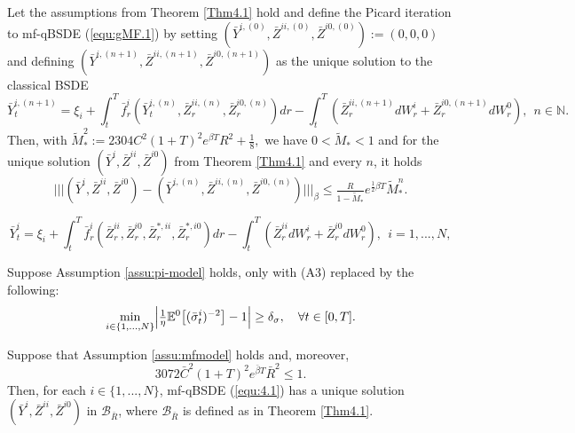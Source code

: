\documentclass[10pt,a4paper]{amsart}
\newcommand{\bC}{\bar{C}}
\newcommand{\bR}{\bar{R}}
\newcommand{\be}{\begin{equation}}
\newcommand{\ee}{\end{equation}}
\newcommand{\trinm}[1]{\vert\!\vert\!\vert #1 \vert\!\vert\!\vert}
\begin{document}
\begin{Corollary}
\label{Cor4.2}
Let the assumptions from Theorem \ref{Thm4.1} hold and define the Picard iteration to mf-qBSDE \textnormal{(\ref{equ:gMF.1})} by setting $(\bar{Y}^{i,(0)},\bar{Z}^{ii,(0)},\bar{Z}^{i0,(0)}):= (0,0,0)$ and defining $(\bar{Y}^{i,(n+1)},\bar{Z}^{ii,(n+1)},\bar{Z}^{i0,(n+1)})$ as the unique solution to the classical BSDE
\[
\bar{Y}_{t}^{i,(n+1)} = \xi_{i} + \int_{t}^{T}\bar{f}_{r}^{i}(\bar{Y}_{t}^{i,(n)},\bar{Z}_{r}^{ii,(n)},\bar{Z}_{r}^{i0,(n)})dr - \int_{t}^{T}(\bar{Z}_{r}^{ii,(n+1)}dW_{r}^{i}+\bar{Z}_{r}^{i0,(n+1)}dW_{r}^{0}), \ \ n \in \mathbb{N}.
\]
Then, with
$
\tilde{M}_{*}^{2} := 2304C^{2}(1+T)^{2}e^{\beta T}R^{2} + \tfrac{1}{8},
$
we have $0<\tilde{M}_{*}<1$ and for the unique solution $(\bar{Y}^{i},\bar{Z}^{ii},\bar{Z}^{i0})$ from Theorem \ref{Thm4.1} and every $n$, it holds
\begin{equation}
\label{NdimPicard2}
\trinm{(\bar{Y}^{i},\bar{Z}^{ii},\bar{Z}^{i0})-(\bar{Y}^{i,(n)},\bar{Z}^{ii,(n)},\bar{Z}^{i0,(n)})}_\beta \leq \tfrac{R}{1-\tilde{M}_{*}}e^{\tfrac{1}{2}\beta T}\tilde{M}_{*}^{n}.
\end{equation}
\end{Corollary}

\begin{equation}
\label{equ:4.1}
\bar{Y}_{t}^{i} = \xi_{i} + \int_{t}^{T}\bar{f}_{r}^{i}(\bar{Z}_{r}^{ii},\bar{Z}_{r}^{i0},\bar{Z}_{r}^{*,ii},\bar{Z}_{r}^{*,i0})dr - \int_{t}^{T}(\bar{Z}_{r}^{ii}dW_{r}^{i}+\bar{Z}_{r}^{i0}dW_{r}^{0}), \ \ i=1,...,N,
\end{equation}

\begin{Assumption}\label{assu:mfmodel}
    Suppose Assumption \ref{assu:pi-model} holds, only with \textnormal{(A3)} replaced by the following: 
$$
\min_{i\in \{1,...,N\} } \Bigl|\tfrac{1}{\eta}\mathbb{E}^{0}\bigl[(\bar{\sigma}_{t}^{i})^{-2}\bigr]-1\Bigr| \geq \delta_{\sigma}, \ \ \ \forall t \in [0,T].
$$
\end{Assumption}

\begin{Corollary}
\label{Cor4.5}
Suppose that Assumption \ref{assu:mfmodel} holds and, moreover,
\be\label{assu:modelbd1}
3072 \bC^{2}(1+T)^{2}e^{\bar{\beta} T} \bR^{2} \leq 1.
\ee
Then, for each $i \in \{1,...,N\}$, mf-qBSDE \textnormal{(\ref{equ:4.1})} has a unique solution $(\bar{Y}^{i},\bar{Z}^{ii},\bar{Z}^{i0})$ in $\mathcal{B}_{\bR}$, where $\mathcal{B}_{\bR}$ is defined as in Theorem \ref{Thm4.1}.
\end{Corollary}
\end{document}
